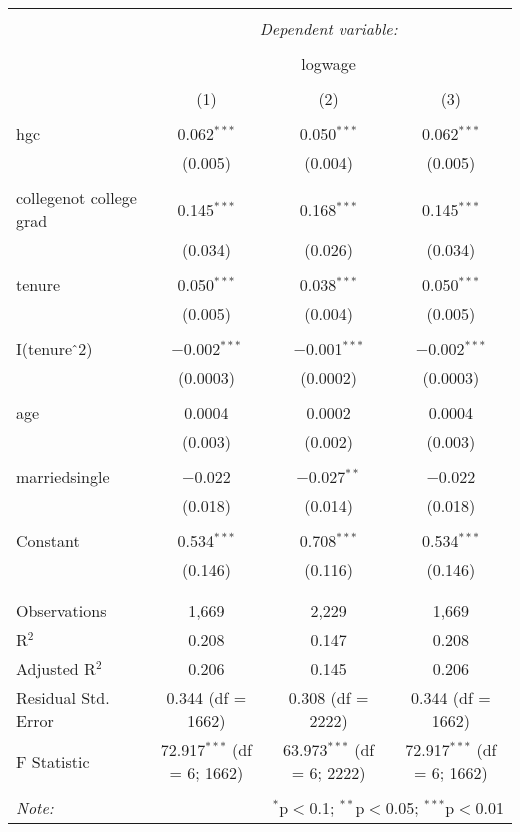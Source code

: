 \documentclass{article}
\begin{document}
\begin{table}[!htbp] \centering 
  \caption{} 
  \label{} 
\begin{tabular}{@{\extracolsep{5pt}}lccc} 
\\[-1.8ex]\hline 
\hline \\[-1.8ex] 
 & \multicolumn{3}{c}{\textit{Dependent variable:}} \\ 
\cline{2-4} 
\\[-1.8ex] & \multicolumn{3}{c}{logwage} \\ 
\\[-1.8ex] & (1) & (2) & (3)\\ 
\hline \\[-1.8ex] 
 hgc & 0.062$^{***}$ & 0.050$^{***}$ & 0.062$^{***}$ \\ 
  & (0.005) & (0.004) & (0.005) \\ 
  & & & \\ 
 collegenot college grad & 0.145$^{***}$ & 0.168$^{***}$ & 0.145$^{***}$ \\ 
  & (0.034) & (0.026) & (0.034) \\ 
  & & & \\ 
 tenure & 0.050$^{***}$ & 0.038$^{***}$ & 0.050$^{***}$ \\ 
  & (0.005) & (0.004) & (0.005) \\ 
  & & & \\ 
 I(tenure$\hat{\mkern6mu}$2) & $-$0.002$^{***}$ & $-$0.001$^{***}$ & $-$0.002$^{***}$ \\ 
  & (0.0003) & (0.0002) & (0.0003) \\ 
  & & & \\ 
 age & 0.0004 & 0.0002 & 0.0004 \\ 
  & (0.003) & (0.002) & (0.003) \\ 
  & & & \\ 
 marriedsingle & $-$0.022 & $-$0.027$^{**}$ & $-$0.022 \\ 
  & (0.018) & (0.014) & (0.018) \\ 
  & & & \\ 
 Constant & 0.534$^{***}$ & 0.708$^{***}$ & 0.534$^{***}$ \\ 
  & (0.146) & (0.116) & (0.146) \\ 
  & & & \\ 
\hline \\[-1.8ex] 
Observations & 1,669 & 2,229 & 1,669 \\ 
R$^{2}$ & 0.208 & 0.147 & 0.208 \\ 
Adjusted R$^{2}$ & 0.206 & 0.145 & 0.206 \\ 
Residual Std. Error & 0.344 (df = 1662) & 0.308 (df = 2222) & 0.344 (df = 1662) \\ 
F Statistic & 72.917$^{***}$ (df = 6; 1662) & 63.973$^{***}$ (df = 6; 2222) & 72.917$^{***}$ (df = 6; 1662) \\ 
\hline 
\hline \\[-1.8ex] 
\textit{Note:}  & \multicolumn{3}{r}{$^{*}$p$<$0.1; $^{**}$p$<$0.05; $^{***}$p$<$0.01} \\ 
\end{tabular} 
\end{table} 
\end{document}
